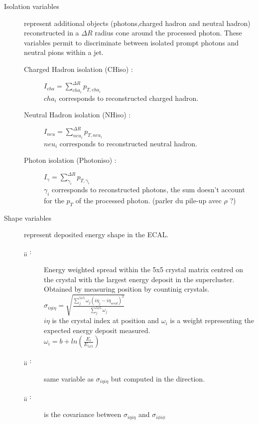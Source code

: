 \begin{description}
    \item [Isolation variables] represent additional objects (photons,charged hadron and neutral hadron) reconstructed
    in a $\Delta R$ radius cone around the processed photon. These variables permit to discriminate between isolated
    prompt photons and neutral pions within a jet.
    \begin{description}
	    \item [Charged Hadron isolation (CHiso) : ] $I_{cha} = \sum_{cha_i}^{\Delta R}{p_{T,cha_i}}$ \\
            $cha_i$ corresponds to reconstructed charged hadron.
	    \item [Neutral Hadron isolation (NHiso) : ] $I_{neu} = \sum_{neu_i}^{\Delta R}{p_{T,neu_i}}$ \\
            $neu_i$ corresponds to reconstructed neutral hadron.
        \item [Photon isolation (Photoniso) : ] $I_\gamma = \sum_{\gamma_i}^{\Delta R}{p_{T,\gamma_i}}$ \\
            $\gamma_i$ corresponds to reconstructed photons, the sum doesn't account for the $p_T$ of the processed
            photon. (parler du pile-up avec $\rho$ ?)
	\\
    \end{description}
    \item [Shape variables] represent deposited energy shape in the ECAL.
    \begin{description}
    	\item [\textsigma\textsubscript{i\texteta i\texteta} :] Energy weighted spread within the 5x5 crystal matrix centred on the crystal with the largest energy deposit in the supercluster. Obtained by measuring position by countinig crystals. \\
		$ \sigma_{i \eta i \eta} = \sqrt{\frac{\sum^{5x5}_{j}\omega_j (i \eta_j - i \eta_{seed})^2}{\sum^{5x5}_{j}\omega_j}}$ \\
		$i \eta$ is the crystal index at position \texteta and $\omega_i$ is a weight representing the expected energy deposit measured.\\
		$\omega_i = b + ln(\frac{E_i}{E_{5x5}})$
		\item [\textsigma\textsubscript{i\textphi i\textphi} :] same variable as $ \sigma_{i \eta i \eta}$ but computed in the \textphi direction.
		\item [\textsigma\textsubscript{i\texteta i\textphi} :] is the covariance between $ \sigma_{i \eta i \eta}$ and $ \sigma_{i \phi i \phi}$

\end{description}
\end{description}
